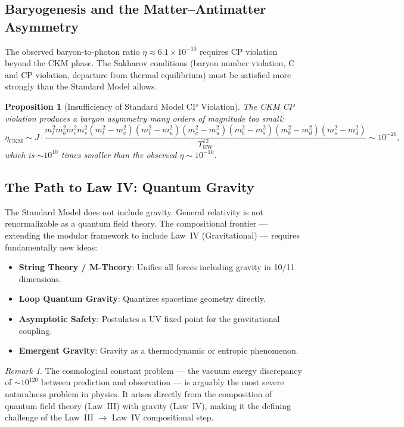 \documentclass[12pt]{article}
\newtheorem{proposition}[theorem]{Proposition}
\theoremstyle{definition}
\theoremstyle{remark}
\newtheorem{remark}[theorem]{Remark}
\begin{document}
\subsection{Baryogenesis and the Matter--Antimatter Asymmetry}

The observed baryon-to-photon ratio $\eta \approx 6.1 \times 10^{-10}$ requires CP violation beyond the CKM phase. The Sakharov conditions (baryon number violation, C and CP violation, departure from thermal equilibrium) must be satisfied more strongly than the Standard Model allows.

\begin{proposition}[Insufficiency of Standard Model CP Violation]
\label{prop:sakharov-insufficient}
The CKM CP violation produces a baryon asymmetry many orders of magnitude too small:
\begin{equation}
\eta_{\mathrm{CKM}} \sim J \cdot \frac{m_t^2 m_b^2 m_c^2 m_s^2 (m_t^2 - m_c^2)(m_t^2 - m_u^2)(m_c^2 - m_u^2)(m_b^2 - m_s^2)(m_b^2 - m_d^2)(m_s^2 - m_d^2)}{T_{\mathrm{EW}}^{12}} \sim 10^{-20},
\end{equation}
which is $\sim 10^{10}$ times smaller than the observed $\eta \sim 10^{-10}$.
\end{proposition}

\subsection{The Path to Law IV: Quantum Gravity}

The Standard Model does not include gravity. General relativity is not renormalizable as a quantum field theory. The compositional frontier --- extending the modular framework to include Law~IV (Gravitational) --- requires fundamentally new ideas:
\begin{itemize}
\item \textbf{String Theory / M-Theory}: Unifies all forces including gravity in 10/11 dimensions.
\item \textbf{Loop Quantum Gravity}: Quantizes spacetime geometry directly.
\item \textbf{Asymptotic Safety}: Postulates a UV fixed point for the gravitational coupling.
\item \textbf{Emergent Gravity}: Gravity as a thermodynamic or entropic phenomenon.
\end{itemize}

\begin{remark}
The cosmological constant problem --- the vacuum energy discrepancy of $\sim 10^{120}$ between prediction and observation --- is arguably the most severe naturalness problem in physics. It arises directly from the composition of quantum field theory (Law~III) with gravity (Law~IV), making it the defining challenge of the Law~III $\to$ Law~IV compositional step.
\end{remark}
\end{document}
